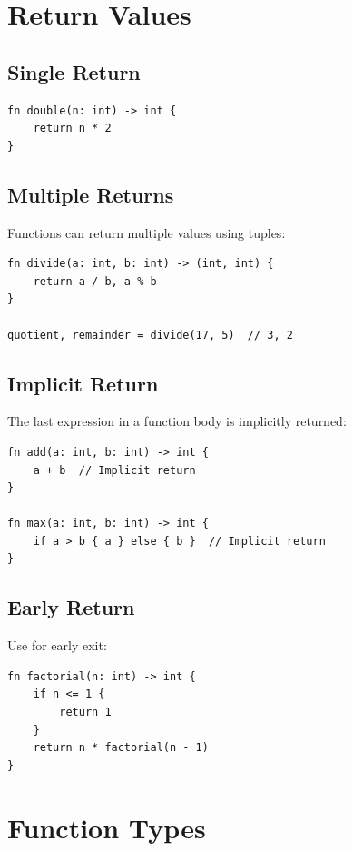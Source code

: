\section{Return Values}

\subsection{Single Return}

\begin{lstlisting}
fn double(n: int) -> int {
    return n * 2
}
\end{lstlisting}

\subsection{Multiple Returns}

Functions can return multiple values using tuples:

\begin{lstlisting}
fn divide(a: int, b: int) -> (int, int) {
    return a / b, a % b
}

quotient, remainder = divide(17, 5)  // 3, 2
\end{lstlisting}

\subsection{Implicit Return}

The last expression in a function body is implicitly returned:

\begin{lstlisting}
fn add(a: int, b: int) -> int {
    a + b  // Implicit return
}

fn max(a: int, b: int) -> int {
    if a > b { a } else { b }  // Implicit return
}
\end{lstlisting}

\subsection{Early Return}

Use  for early exit:

\begin{lstlisting}
fn factorial(n: int) -> int {
    if n <= 1 {
        return 1
    }
    return n * factorial(n - 1)
}
\end{lstlisting}

\section{Function Types}


